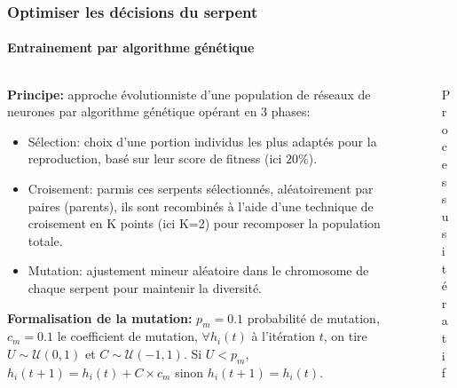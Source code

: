 \documentclass[10pt]{beamer}
\begin{document}
\begin{frame}
\frametitle{Optimiser les décisions du serpent}
\framesubtitle{Entrainement par algorithme génétique}
\begin{columns}[T]
\begin{column}{0.60\textwidth}
\footnotesize

\textbf{Principe:} approche évolutionniste d'une population de réseaux de neurones par algorithme génétique opérant en 3 phases:
\begin{itemize}
  \item Sélection: choix d'une portion individus les plus adaptés pour la reproduction, basé sur leur score de fitness (ici $20\%$).
  \item Croisement: parmis ces serpents sélectionnés, aléatoirement par paires (parents), ils sont recombinés à l'aide d'une technique de croisement en K points (ici K=2) pour recomposer la population totale.
  \item Mutation: ajustement mineur aléatoire dans le chromosome de chaque serpent pour maintenir la diversité.
\end{itemize}

\textbf{Formalisation de la mutation:} $p_m=0.1$ probabilité de mutation, $c_m=0.1$ le coefficient de mutation, $\forall h_i(t)$ à l'itération $t$, on tire $U \sim \mathcal{U}(0, 1)$ et $C \sim \mathcal{U}(-1, 1)$. Si $U<p_m$, $h_i(t+1)=h_i(t)+C\times c_m$ sinon $h_i(t+1)=h_i(t)$.
\end{column}

\begin{column}{0.40\textwidth}

\begin{figure}
\centering
\caption*{\tiny Processus itératif}
\end{figure}


\end{column}
\end{columns}
\end{frame}
\end{document}
